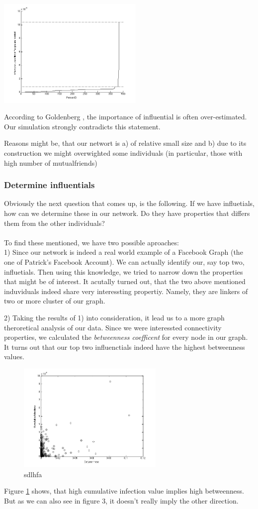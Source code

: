 \includegraphics[width=7cm]{influ3}


According to Goldenberg \cite{word2mouth}, the importance of influential is often over-estimated. Our simulation strongly contradicts this statement. 

Reasons might be, that our networt is a) of relative small size and b) due to its construction we might overwighted some individuals (in particular, those with high number of mutualfriends)


\subsubsection{Determine influentials}

Obviously the next question that comes up, is the following. If we have influetials, how can we determine these in our network. Do they have properties that differs them from the other individuals? \\ 
\\
To find these mentioned, we have two possible aproaches: 
\\

1) Since our network is indeed a real world example of a Facebook Graph (the one of Patrick's Facebook Account). We can actually identify our, say top two, influetials. Then using this knowledge, we tried to narrow down the properties that might be of interest. 
It acutally turned out, that the two above mentioned induviduals indeed share very interessting propertiy. Namely, they are linkers of two or more cluster of our graph. 

2) Taking the results of 1) into consideration, it lead us to a more graph theroretical analysis of our data. Since we were interessted connectivity properties, we calculated the \textit{betweenness coefficent} for every node in our graph. 
It turns out that our top two influenctials indeed have the highest betweenness values. 

\begin{figure}
\includegraphics[width=7cm]{influ4}
\caption{sdlhfa}
\label{Betweenness}
\end{figure}

Figure \ref{Betweenness} shows, that high cumulative infection value implies high betweenness. But as we can also see in figure 3, it doesn't really imply the other direction.





